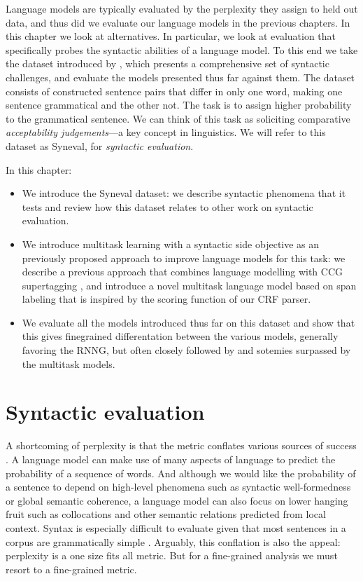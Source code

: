 Language models are typically evaluated by the perplexity they assign to held out data, and thus did we evaluate our language models in the previous chapters. In this chapter we look at alternatives. In particular, we look at evaluation that specifically probes the syntactic abilities of a language model. To this end we take the dataset introduced by \citet{linzen2018targeted}, which presents a comprehensive set of syntactic challenges, and evaluate the models presented thus far against them. The dataset consists of constructed sentence pairs that differ in only one word, making one sentence grammatical and the other not. The task is to assign higher probability to the grammatical sentence. We can think of this task as soliciting comparative \textit{acceptability judgements}---a key concept in linguistics. We will refer to this dataset as Syneval, for \textit{syntactic evaluation}.

In this chapter:
\begin{itemize}
  \item We introduce the Syneval dataset: we describe syntactic phenomena that it tests and review how this dataset relates to other work on syntactic evaluation.
  \item We introduce multitask learning with a syntactic side objective as an previously proposed approach to improve language models for this task: we describe a previous approach that combines language modelling with CCG supertagging \citep{enguehard2017multitask}, and introduce a novel multitask language model based on span labeling that is inspired by the scoring function of our CRF parser.
  \item We evaluate all the models introduced thus far on this dataset and show that this gives finegrained differentation between the various models, generally favoring the RNNG, but often closely followed by and sotemies surpassed by the multitask models.
\end{itemize}

\section{Syntactic evaluation}
A shortcoming of perplexity is that the metric conflates various sources of success \citep{linzen2018targeted}. A language model can make use of many aspects of language to predict the probability of a sequence of words. And although we would like the probability of a sentence to depend on high-level phenomena such as syntactic well-formedness or global semantic coherence, a language model can also focus on lower hanging fruit such as collocations and other semantic relations predicted from local context. Syntax is especially difficult to evaluate given that most sentences in a corpus are grammatically simple \citep{linzen2018targeted}. Arguably, this conflation is also the appeal: perplexity is a one size fits all metric. But for a fine-grained analysis we must resort to a fine-grained metric.

